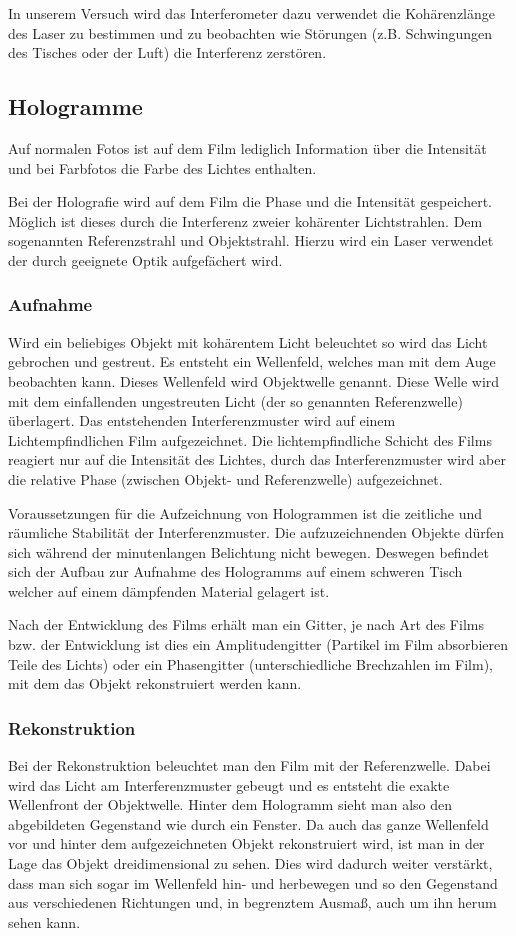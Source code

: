\documentclass[12pt]{article}
\begin{document}
In unserem Versuch wird das Interferometer dazu verwendet die Kohärenzlänge des Laser zu bestimmen und zu beobachten wie Störungen
(z.B. Schwingungen des Tisches oder der Luft) die Interferenz zerstören.
\subsection{Hologramme}
Auf normalen Fotos ist auf dem Film lediglich Information über die Intensität und bei Farbfotos die Farbe des Lichtes enthalten.

Bei der Holografie wird auf dem Film die Phase und die Intensität gespeichert. Möglich ist dieses durch die Interferenz zweier kohärenter Lichtstrahlen.
Dem sogenannten Referenzstrahl und Objektstrahl. Hierzu wird ein Laser verwendet der durch geeignete Optik aufgefächert wird.
\subsubsection{Aufnahme}
Wird ein beliebiges Objekt mit kohärentem Licht beleuchtet so wird das Licht gebrochen und gestreut. Es entsteht ein Wellenfeld, welches man mit dem Auge
beobachten kann. Dieses Wellenfeld wird Objektwelle genannt. Diese Welle wird mit dem einfallenden ungestreuten Licht (der so genannten Referenzwelle)
überlagert. Das entstehenden Interferenzmuster wird auf einem Lichtempfindlichen Film aufgezeichnet. Die lichtempfindliche Schicht des Films reagiert nur auf
die Intensität des Lichtes, durch das Interferenzmuster wird aber die relative Phase (zwischen Objekt- und Referenzwelle) aufgezeichnet.

Voraussetzungen für die Aufzeichnung von Hologrammen ist die zeitliche und räumliche Stabilität der Interferenzmuster. Die aufzuzeichnenden Objekte dürfen
sich während der minutenlangen Belichtung nicht bewegen. Deswegen befindet sich der Aufbau zur Aufnahme des Hologramms auf einem schweren Tisch welcher auf 
einem dämpfenden Material gelagert ist. 

Nach der Entwicklung des Films erhält man ein Gitter, je nach Art des Films bzw. der Entwicklung ist dies ein Amplitudengitter (Partikel im Film absorbieren
Teile des Lichts) oder ein Phasengitter (unterschiedliche Brechzahlen im Film), mit dem das Objekt rekonstruiert werden kann.

\subsubsection{Rekonstruktion}
Bei der Rekonstruktion beleuchtet man den Film mit der Referenzwelle. Dabei wird das Licht am Interferenzmuster gebeugt und es entsteht die exakte
Wellenfront der Objektwelle. Hinter dem Hologramm sieht man also den abgebildeten Gegenstand wie durch ein Fenster.
Da auch das ganze Wellenfeld vor und hinter dem aufgezeichneten Objekt rekonstruiert wird, ist man in der Lage das Objekt dreidimensional zu sehen. Dies
wird dadurch weiter verstärkt, dass man sich sogar im Wellenfeld hin- und herbewegen und so den Gegenstand aus verschiedenen Richtungen und, in begrenztem
Ausmaß, auch um ihn herum sehen kann.
\end{document}
